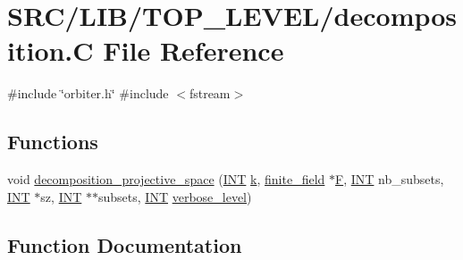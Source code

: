 \hypertarget{_t_o_p___l_e_v_e_l_2decomposition_8_c}{}\section{S\+R\+C/\+L\+I\+B/\+T\+O\+P\+\_\+\+L\+E\+V\+E\+L/decomposition.C File Reference}
\label{_t_o_p___l_e_v_e_l_2decomposition_8_c}
{\ttfamily \#include \char`\"{}orbiter.\+h\char`\"{}}\newline
{\ttfamily \#include $<$fstream$>$}\newline
\subsection*{Functions}
\begin{DoxyCompactItemize}
\item 
void \mbox{\hyperlink{_t_o_p___l_e_v_e_l_2decomposition_8_c_a82c6b40b3138e3e5bae2299d49680ac1}{decomposition\+\_\+projective\+\_\+space}} (\mbox{\hyperlink{galois_8h_a09fddde158a3a20bd2dcadb609de11dc}{I\+NT}} \mbox{\hyperlink{simeon_8_c_a43fa990200c3ddd47c35f151bd4d66bf}{k}}, \mbox{\hyperlink{classfinite__field}{finite\+\_\+field}} $\ast$\mbox{\hyperlink{simeon_8_c_a21a61c535ff7d9d4b674461d3b19fffa}{F}}, \mbox{\hyperlink{galois_8h_a09fddde158a3a20bd2dcadb609de11dc}{I\+NT}} nb\+\_\+subsets, \mbox{\hyperlink{galois_8h_a09fddde158a3a20bd2dcadb609de11dc}{I\+NT}} $\ast$sz, \mbox{\hyperlink{galois_8h_a09fddde158a3a20bd2dcadb609de11dc}{I\+NT}} $\ast$$\ast$subsets, \mbox{\hyperlink{galois_8h_a09fddde158a3a20bd2dcadb609de11dc}{I\+NT}} \mbox{\hyperlink{simeon_8_c_a818073fbcc2f439e7c56952f67386122}{verbose\+\_\+level}})
\end{DoxyCompactItemize}


\subsection{Function Documentation}
\mbox{\label{_t_o_p___l_e_v_e_l_2decomposition_8_c_a82c6b40b3138e3e5bae2299d49680ac1}} 
